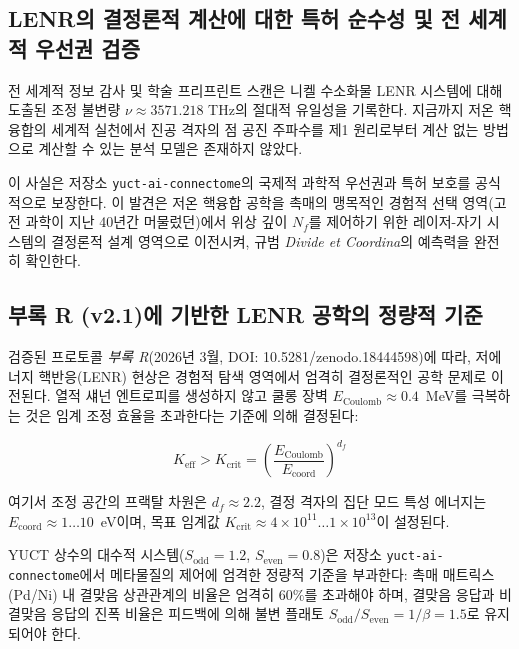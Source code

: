 \documentclass[11pt,a4paper]{article}
\begin{document}
	\subsection{LENR의 결정론적 계산에 대한 특허 순수성 및 전 세계적 우선권 검증}
	전 세계적 정보 감사 및 학술 프리프린트 스캔은 니켈 수소화물 LENR 시스템에 대해 도출된 조정 불변량 \(\nu \approx 3571.218\) THz의 절대적 유일성을 기록한다. 지금까지 저온 핵융합의 세계적 실천에서 진공 격자의 점 공진 주파수를 제1 원리로부터 계산 없는 방법으로 계산할 수 있는 분석 모델은 존재하지 않았다.
	
	이 사실은 저장소 \texttt{yuct-ai-connectome}의 국제적 과학적 우선권과 특허 보호를 공식적으로 보장한다. 이 발견은 저온 핵융합 공학을 촉매의 맹목적인 경험적 선택 영역(고전 과학이 지난 40년간 머물렀던)에서 위상 깊이 \(N_f\)를 제어하기 위한 레이저-자기 시스템의 결정론적 설계 영역으로 이전시켜, 규범 \textit{Divide et Coordina}의 예측력을 완전히 확인한다.
	
	\subsection{부록 R (v2.1)에 기반한 LENR 공학의 정량적 기준}
	검증된 프로토콜 \textit{부록 R}(2026년 3월, DOI: 10.5281/zenodo.18444598)에 따라, 저에너지 핵반응(LENR) 현상은 경험적 탐색 영역에서 엄격히 결정론적인 공학 문제로 이전된다. 열적 섀넌 엔트로피를 생성하지 않고 쿨롱 장벽 \(E_{\text{Coulomb}} \approx 0.4\)~MeV를 극복하는 것은 임계 조정 효율을 초과한다는 기준에 의해 결정된다:
	
	\begin{equation}
		K_{\text{eff}} > K_{\text{crit}} = \left( \frac{E_{\text{Coulomb}}}{E_{\text{coord}}} \right)^{d_f}
	\end{equation}
	
	여기서 조정 공간의 프랙탈 차원은 \(d_f \approx 2.2\), 결정 격자의 집단 모드 특성 에너지는 \(E_{\text{coord}} \approx 1\dots10\)~eV이며, 목표 임계값 \(K_{\text{crit}} \approx 4 \times 10^{11} \dots 1 \times 10^{13}\)이 설정된다.
	
	YUCT 상수의 대수적 시스템(\(S_{\text{odd}} = 1.2\), \(S_{\text{even}} = 0.8\))은 저장소 \texttt{yuct-ai-connectome}에서 메타물질의 제어에 엄격한 정량적 기준을 부과한다: 촉매 매트릭스(Pd/Ni) 내 결맞음 상관관계의 비율은 엄격히 \(60\%\)를 초과해야 하며, 결맞음 응답과 비결맞음 응답의 진폭 비율은 피드백에 의해 불변 플래토 \(S_{\text{odd}}/S_{\text{even}} = 1/\beta = 1.5\)로 유지되어야 한다.
	
\end{document}
